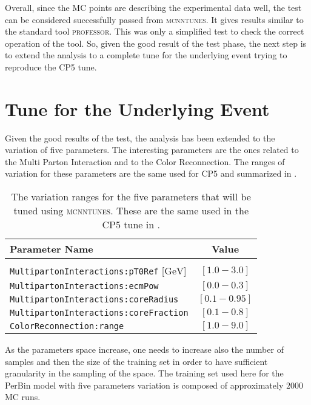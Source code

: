 Overall, since the MC points are describing the experimental data well, the test can be considered successfully passed from \textsc{mcnntunes}. It gives results similar to the standard tool \textsc{professor}. This was only a simplified test to check the correct operation of the tool. So, given  the good result of the test phase, the next step is to extend the analysis to a complete tune for the underlying event trying to reproduce the CP5 tune.




\section{Tune for the Underlying Event}

Given the good results of the test, the analysis has been extended to the variation of five parameters. The interesting  parameters are the ones related to the Multi Parton Interaction and to the Color Reconnection. The ranges of variation for these parameters are the same used for CP5 and summarized in .

\begin{table}[!htb]
\centering
\begin{tabular}{l | c }
Parameter Name & Value \\ 
\hline \hline
\\[-0.85em]
	\texttt{MultipartonInteractions:pT0Ref} [$\mathrm{GeV}$] & $[1.0 - 3.0]$\\[2pt]
	\texttt{MultipartonInteractions:ecmPow} & $[0.0 - 0.3]$\\[2pt]
	\texttt{MultipartonInteractions:coreRadius} & $[0.1 - 0.95 ]$\\[2pt]
	\texttt{MultipartonInteractions:coreFraction} & $[ 0.1 - 0.8 ]$\\[2pt]
	\texttt{ColorReconnection:range} & $[  1.0 - 9.0 ]$
\end{tabular}
\caption{The variation ranges for the five parameters that will be tuned using \textsc{mcnntunes}. These are the same used in the CP5 tune in \cite{CPtunes}.}
\label{table:ranges5params}
\end{table}

\noindent As the parameters space increase, one needs to increase also the number of samples and then the size of the training set in order to have  sufficient granularity in the sampling of the space. 
The training set used here for the PerBin model with five parameters variation is composed of approximately $2000$ MC runs. 

